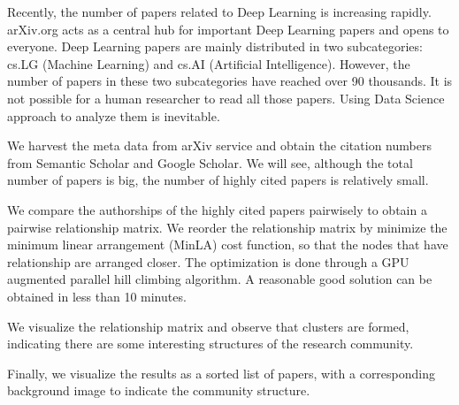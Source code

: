 
Recently, the number of papers related to Deep Learning is increasing rapidly.
arXiv.org acts as a central hub for important Deep Learning papers and opens to everyone.
Deep Learning papers are mainly distributed in two subcategories: cs.LG (Machine Learning) and cs.AI (Artificial Intelligence).
However, the number of papers in these two subcategories have reached over 90 thousands.
It is not possible for a human researcher to read all those papers.
Using Data Science approach to analyze them is inevitable.

We harvest the meta data from arXiv service and obtain the citation numbers from Semantic Scholar and Google Scholar.
We will see, although the total number of papers is big, the number of highly cited papers is relatively small.

We compare the authorships of the highly cited papers pairwisely to obtain a pairwise relationship matrix.
We reorder the relationship matrix by minimize the minimum linear arrangement (MinLA) cost function, so that the nodes that have relationship are arranged closer.
The optimization is done through a GPU augmented parallel hill climbing algorithm.
A reasonable good solution can be obtained in less than 10 minutes.

We visualize the relationship matrix and observe that clusters are formed, indicating there are some interesting structures of the research community.

Finally, we visualize the results as a sorted list of papers, with a corresponding background image to indicate the community structure.


